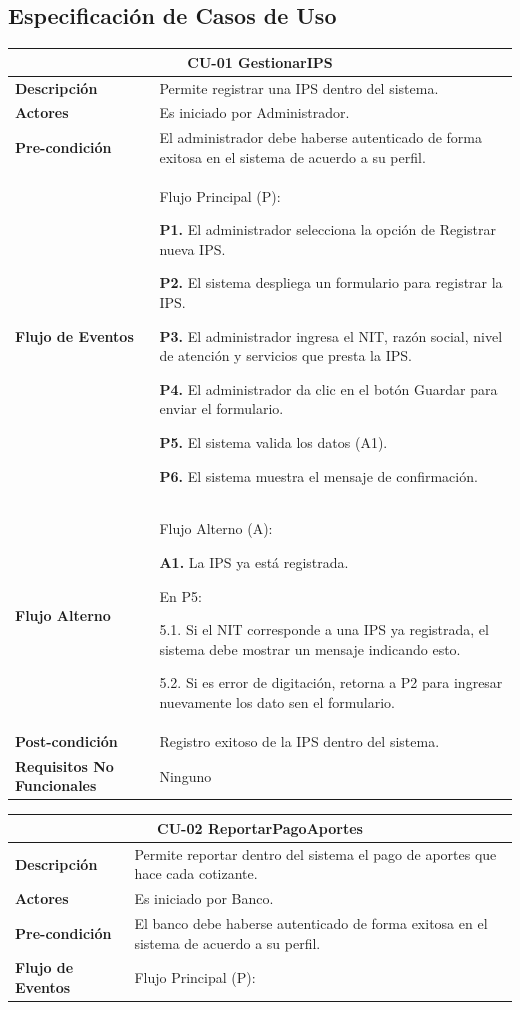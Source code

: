 \documentclass[12pt,a4paper]{article}
\begin{document}
\subsection{Especificación de Casos de Uso}
\begin{center}
\begin{tabular}{|m{5.5cm}| m{9.5cm}|}
\hline 
\multicolumn{2}{|c|}{\textbf{CU-01 GestionarIPS}} \\ 
\hline 
\textbf{Descripción} & Permite registrar una IPS dentro del sistema. \\ 
\hline 
\textbf{Actores} & Es iniciado por Administrador. \\ 
\hline 
\textbf{Pre-condición} & El administrador debe haberse autenticado de forma exitosa en el sistema de acuerdo a su perfil. \\ 
\hline 
\textbf{Flujo de Eventos} & Flujo Principal (P):

\textbf{P1.} El administrador selecciona la opción de Registrar nueva IPS.

\textbf{P2.} El sistema despliega un formulario para registrar la IPS.

\textbf{P3.} El administrador ingresa el NIT, razón social, nivel de atención y servicios que presta la IPS.

\textbf{P4.} El administrador da clic en el botón Guardar para enviar el formulario.

\textbf{P5.} El sistema valida los datos (A1).

\textbf{P6.} El sistema muestra el mensaje de confirmación.
\\
\hline 
\textbf{Flujo Alterno} &  Flujo Alterno (A):

\textbf{A1.} La IPS ya está registrada.

	En P5:
	
	5.1. Si el NIT corresponde a una IPS ya registrada, el sistema debe mostrar un mensaje indicando esto.
	
	5.2. Si es error de digitación, retorna a P2 para ingresar nuevamente los dato sen el formulario. \\ 
\hline 
\textbf{Post-condición}  & Registro exitoso de la IPS dentro del sistema. \\ 
\hline 
\textbf{Requisitos No Funcionales} & Ninguno \\ 
\hline 
\end{tabular}
\vspace{5mm}

\begin{tabular}{|m{5.5cm}| m{9.5cm}|}
\hline 
\multicolumn{2}{|c|}{\textbf{CU-02 ReportarPagoAportes}} \\ 
\hline 
\textbf{Descripción} & Permite reportar dentro del sistema el pago de aportes que hace cada cotizante. \\ 
\hline 
\textbf{Actores} & Es iniciado por Banco. \\ 
\hline 
\textbf{Pre-condición} & El banco debe haberse autenticado de forma exitosa en el sistema de acuerdo a su perfil. \\ 
\hline 
\textbf{Flujo de Eventos} & Flujo Principal (P):


\end{tabular}
\end{center}
\end{document}
